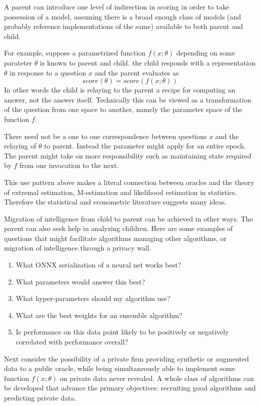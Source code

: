 A parent can introduce one level of indirection in scoring in order to take possession of a model, assuming there is a broad enough class of models (and probably reference implementations of the same) available to both parent and child. 

For example, suppose a parametrized function $f(x;\theta)$ depending on some parateter $\theta$ is known to parent and child. the child responds with a representation $\theta$ in response to a question $x$ and the parent evaluates as 
$$
     score(\theta) = score( f(x;\theta) )
$$
In other words the child is relaying to the parent a recipe for computing an answer, not the answer itself. 
Technically this can be viewed as a transformation of the question from one space to another, namely the parameter space of the function $f$. 

There need not be a one to one correspondence between questions $x$ and the relaying of $\theta$ to parent. Instead the parameter might apply for an entire epoch. The parent might take on more responsibility such as maintaining state required by $f$ from one invocation to the next. 

This use pattern above makes a literal connection between oracles and the theory of extremal estimation, M-estimation and likelihood estimation in statistics. Therefore the statistical and econometric literature suggests many ideas. 

Migration of intelligence from child to parent can be achieved in other ways. The parent can also seek help in analyzing children. Here are some examples of questions that might facilitate algorithms managing other algorithms, or migration of intelligence through a privacy wall. 

\begin{enumerate}
\item What ONNX serialization of a neural net works best? 
\item What parameters would answer this best? 
\item What hyper-parameters should my algorithm use? 
\item What are the best weights for an ensemble algorithm? 
\item Is performance on this data point likely to be positively or negatively correlated with performance overall?
\end{enumerate}

Next consider the possibility of a private firm providing synthetic or augmented data to a public oracle, while being simultaneously able to implement some function $f(x;\theta)$ on private data never revealed. A whole class of algorithms can be developed that advance the primary objectives: recruiting good algorithms and predicting private data. 

